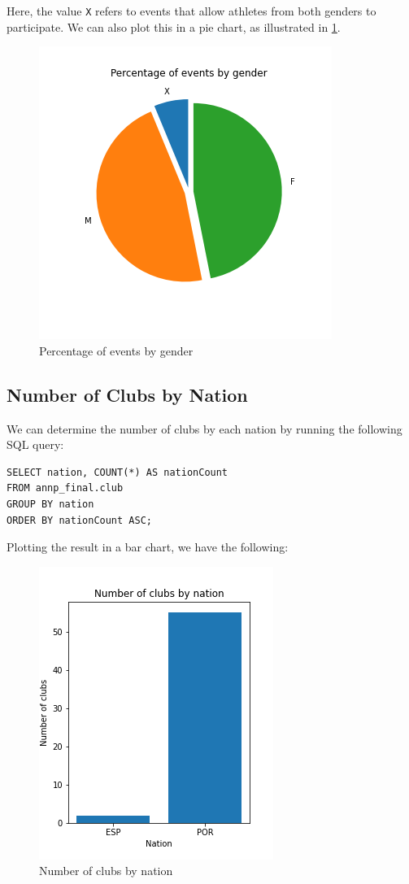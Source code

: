 Here, the value \texttt{X} refers to events that allow athletes from both genders to participate.
We can also plot this in a pie chart, as illustrated in \cref{fig:eventsbygender-pie}.

\begin{figure}[H]
    \centering
    \includegraphics[width=.45\textwidth]{img/eventsbygender-pie}
    \caption{Percentage of events by gender}
    \label{fig:eventsbygender-pie}
\end{figure}

\subsection{Number of Clubs by Nation}\label{subsec:number-of-clubs-by-nation}

We can determine the number of clubs by each nation by running the following SQL query:

\begin{verbatim}
SELECT nation, COUNT(*) AS nationCount
FROM annp_final.club
GROUP BY nation
ORDER BY nationCount ASC;
\end{verbatim}

Plotting the result in a bar chart, we have the following:

\begin{figure}[H]
    \centering
    \includegraphics[width=.35\textwidth]{img/clubsbynation}
    \caption{Number of clubs by nation}
    \label{fig:clubs-by-nation}
\end{figure}


